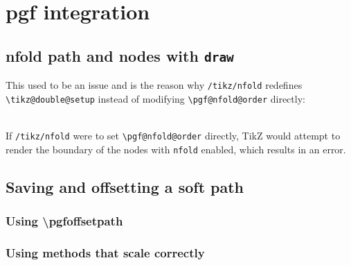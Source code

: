 \documentclass[11pt,a4paper]{article}
\begin{document}
\section{pgf integration}

\subsection{nfold path and nodes with \texttt{draw}}

This used to be an issue and is the reason why \texttt{/tikz/nfold} redefines \verb"\tikz@double@setup" instead of modifying \verb"\pgf@nfold@order" directly:\\
\\
If \texttt{/tikz/nfold} were to set \verb"\pgf@nfold@order" directly, TikZ would attempt to render the boundary of the nodes with \texttt{nfold} enabled, which results in an error.


\subsection{Saving and offsetting a soft path}

\subsubsection{Using \textbackslash pgfoffsetpath}

\subsubsection{Using methods that scale correctly}
\end{document}
